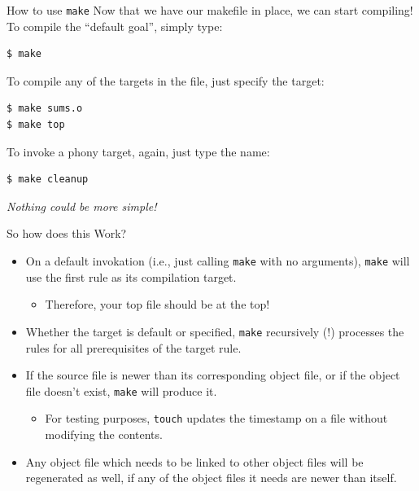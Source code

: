 \documentclass[11pt]{beamer}
\begin{document}
\begin{frame}[fragile=singleslide]{How to use \texttt{make}}
Now that we have our makefile in place, we can start compiling!  To compile the ``default goal'', simply type:
\begin{lstlisting}[style=terminal]
$ make
\end{lstlisting}
To compile any of the targets in the file, just specify the target:
\begin{lstlisting}[style=terminal]
$ make sums.o
$ make top
\end{lstlisting}
To invoke a phony target, again, just type the name:
\begin{lstlisting}[style=terminal]
$ make cleanup
\end{lstlisting}
{\center
\emph{Nothing could be more simple!}}
\end{frame}

\begin{frame}{So how does this Work?}
\begin{itemize}
\item On a default invokation (i.e., just calling \texttt{make} with no arguments), \texttt{make} will use the first rule as its compilation target.  
\begin{itemize}
\item Therefore, your top file should be at the top! 
\end{itemize}
\item Whether the target is default or specified, \texttt{make} recursively (!) processes the rules for all prerequisites of the target rule.  
\item If the source file is newer than its corresponding object file, or if the object file doesn't exist, \texttt{make} will produce it.
\begin{itemize}
\item For testing purposes, \texttt{touch} updates the timestamp on a file without modifying the contents.
\end{itemize}
\item Any object file which needs to be linked to other object files will be regenerated as well, if any of the object files it needs are newer than itself.  
\end{itemize}
\end{frame}
\end{document}

